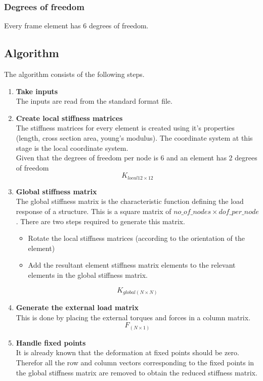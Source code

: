 \documentclass[12pt]{article}
\begin{document}
\subsubsection{Degrees of freedom}
Every frame element has 6 degrees of freedom.

\subsection{Algorithm}
The algorithm consists of the following steps.\\
\begin{enumerate}
    \item \textbf{Take inputs}\\
    The inputs are read from the standard format file. 
    \item \textbf{Create local stiffness matrices}\\
    The stiffness matrices for every element is created using it's properties (length, cross section area, young's modulus). The coordinate system at this stage is the local coordinate system.\\
    Given that the degrees of freedom per node is 6 and an element has 2 degrees of freedom $$K_{local 12\times12}$$
    \item \textbf{Global stiffness matrix}\\ The global stiffness matrix is the characteristic function defining the load response of a structure. This is a square matrix of $no\_of\_nodes \times dof\_per\_node$. There are two steps required to generate this matrix.
    \begin{itemize}
        \item Rotate the local stiffness matrices (according to the orientation of the element)
        \item Add the resultant element stiffness matrix elements to the relevant elements in the global stiffness matrix.
    \end{itemize}
    
    $$K_{global (N \times N)}$$
    
    \item \textbf{Generate the external load matrix}\\
    This is done by placing the external torques and forces in a column matrix.
    $$F_{(N \times 1)}$$
    \item \textbf{Handle fixed points}\\
    It is already known that the deformation at fixed points should be zero. Therefor all the row and column vectors corresponding to the fixed points in the global stiffness matrix are removed to obtain the reduced stiffness matrix.
    

\end{enumerate}
\end{document}
